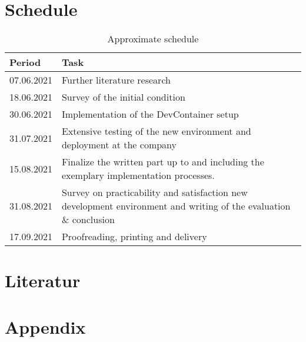\documentclass[12pt, a4paper]{article}
\begin{document}
\section{Schedule}
\begin{table}[H]
    \begin{tabular}{ll}
    \hline
    Period     & Task                                                                                                              \\ \hline\hline
    07.06.2021 & Further literature research                                                                                       \\ \hline
    18.06.2021 & Survey of the initial condition                                                                                   \\ \hline
    30.06.2021 & Implementation of the DevContainer setup                                                                          \\ \hline
    31.07.2021 & Extensive testing of the new environment and deployment at the company                                             \\ \hline
    15.08.2021 & Finalize the written part up to and including the exemplary implementation processes.                             \\ \hline
    31.08.2021 & Survey on practicability and satisfaction new development environment and writing of the evaluation \& conclusion \\ \hline
    17.09.2021 & Proofreading, printing and delivery                                                                               \\ \hline
    \end{tabular}
    \caption{Approximate schedule}
    \label{tab::time}
    \end{table}
\section{Literatur}


\newpage

\renewcommand{\thesubsection}{\Alph{subsection}}
\setcounter{page}{\value{lastroman}}
\section*{Appendix}
\listoffigures


\end{document}
